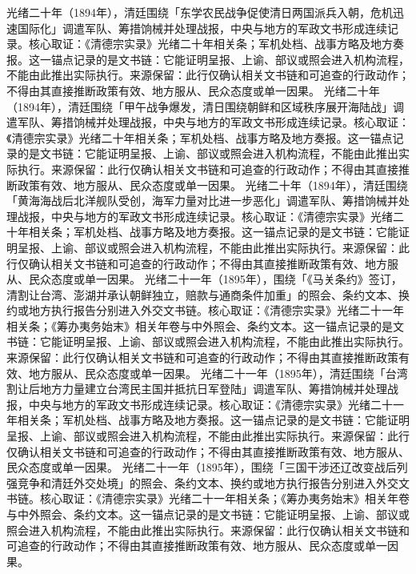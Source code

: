 光绪二十年（1894年），清廷围绕「东学农民战争促使清日两国派兵入朝，危机迅速国际化」调遣军队、筹措饷械并处理战报，中央与地方的军政文书形成连续记录。核心取证：《清德宗实录》光绪二十年相关条；军机处档、战事方略及地方奏报。这一锚点记录的是文书链：它能证明呈报、上谕、部议或照会进入机构流程，不能由此推出实际执行。来源保留：此行仅确认相关文书链和可追查的行政动作；不得由其直接推断政策有效、地方服从、民众态度或单一因果。
光绪二十年（1894年），清廷围绕「甲午战争爆发，清日围绕朝鲜和区域秩序展开海陆战」调遣军队、筹措饷械并处理战报，中央与地方的军政文书形成连续记录。核心取证：《清德宗实录》光绪二十年相关条；军机处档、战事方略及地方奏报。这一锚点记录的是文书链：它能证明呈报、上谕、部议或照会进入机构流程，不能由此推出实际执行。来源保留：此行仅确认相关文书链和可追查的行政动作；不得由其直接推断政策有效、地方服从、民众态度或单一因果。
光绪二十年（1894年），清廷围绕「黄海海战后北洋舰队受创，海军力量对比进一步恶化」调遣军队、筹措饷械并处理战报，中央与地方的军政文书形成连续记录。核心取证：《清德宗实录》光绪二十年相关条；军机处档、战事方略及地方奏报。这一锚点记录的是文书链：它能证明呈报、上谕、部议或照会进入机构流程，不能由此推出实际执行。来源保留：此行仅确认相关文书链和可追查的行政动作；不得由其直接推断政策有效、地方服从、民众态度或单一因果。
光绪二十一年（1895年），围绕「《马关条约》签订，清割让台湾、澎湖并承认朝鲜独立，赔款与通商条件加重」的照会、条约文本、换约或地方执行报告分别进入外交文书链。核心取证：《清德宗实录》光绪二十一年相关条；《筹办夷务始末》相关年卷与中外照会、条约文本。这一锚点记录的是文书链：它能证明呈报、上谕、部议或照会进入机构流程，不能由此推出实际执行。来源保留：此行仅确认相关文书链和可追查的行政动作；不得由其直接推断政策有效、地方服从、民众态度或单一因果。
光绪二十一年（1895年），清廷围绕「台湾割让后地方力量建立台湾民主国并抵抗日军登陆」调遣军队、筹措饷械并处理战报，中央与地方的军政文书形成连续记录。核心取证：《清德宗实录》光绪二十一年相关条；军机处档、战事方略及地方奏报。这一锚点记录的是文书链：它能证明呈报、上谕、部议或照会进入机构流程，不能由此推出实际执行。来源保留：此行仅确认相关文书链和可追查的行政动作；不得由其直接推断政策有效、地方服从、民众态度或单一因果。
光绪二十一年（1895年），围绕「三国干涉还辽改变战后列强竞争和清廷外交处境」的照会、条约文本、换约或地方执行报告分别进入外交文书链。核心取证：《清德宗实录》光绪二十一年相关条；《筹办夷务始末》相关年卷与中外照会、条约文本。这一锚点记录的是文书链：它能证明呈报、上谕、部议或照会进入机构流程，不能由此推出实际执行。来源保留：此行仅确认相关文书链和可追查的行政动作；不得由其直接推断政策有效、地方服从、民众态度或单一因果。
